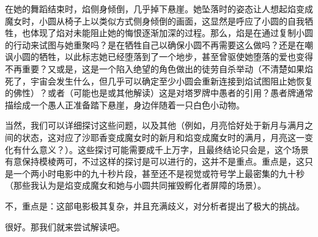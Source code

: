在她的舞蹈结束时，焰侧身倾倒，几乎掉下悬崖。她坠落时的姿态让人想起焰变成魔女时，小圆从椅子上以类似方式侧身倾倒的画面，这显然是呼应了小圆的自我牺牲，也体现了焰对未能阻止她的悔恨逐渐加深的过程。那么，焰是在通过复制小圆的行动来试图与她重聚吗？是在牺牲自己以确保小圆不再需要这么做吗？还是在嘲讽小圆的牺牲，以此标志她已经堕落到了一个地步，甚至曾驱使她堕落的爱也变得不再重要？又或是，这是一个陷入绝望的角色做出的徒劳自杀举动（不清楚如果焰死了，宇宙会发生什么，但几乎可以确定至少小圆会重新连接到焰试图阻止她恢复的佛性）？或者（可能也是或其他解读）这是对塔罗牌中愚者的引用？愚者牌通常描绘成一个愚人正准备踏下悬崖，身边伴随着一只白色小动物。

当然，我们可以详细探讨这些问题，以及其他（例如，月亮恰好处于新月与满月之间的状态，这对应了沙耶香变成魔女时的新月和焰变成魔女时的满月，月亮这一变化有什么意义？）。这些探讨可能需要成千上万字，且最终结论只会是，这个场景有意保持模棱两可，不过这样的探讨是可以进行的，这并不是重点。重点是，这只是一个两小时电影中的九十秒片段，甚至还不是视觉或符号学上最密集的九十秒（那些我认为是焰变成魔女和她与小圆共同摧毁孵化者屏障的场景）。

不，重点是：这部电影极其复杂，并且充满歧义，对分析者提出了极大的挑战。

很好。那我们就来尝试解读吧。